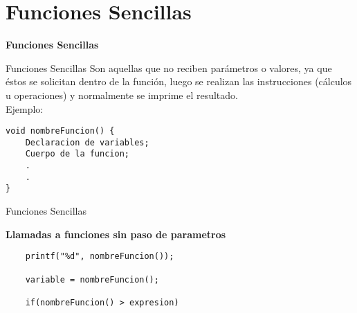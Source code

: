 \section*{Funciones Sencillas}

\begin{frame}[c] 
\centering
\huge \textbf{Funciones Sencillas}
\end{frame}



\begin{frame}[fragile]{Funciones Sencillas}
\hspace{5mm}Son aquellas que no reciben parámetros o valores, ya que éstos se solicitan dentro de la función, luego se realizan las instrucciones (cálculos u operaciones) y normalmente se imprime el resultado.\\Ejemplo:
\begin{lstlisting}
void nombreFuncion() {
    Declaracion de variables;
    Cuerpo de la funcion;
    .
    .
}
\end{lstlisting}
\end{frame}



\begin{frame}[fragile]{Funciones Sencillas}
\begin{center}
    \textbf{Llamadas a funciones sin paso de parametros}
\end{center}
\begin{lstlisting}
    printf("%d", nombreFuncion());
    
    variable = nombreFuncion();
    
    if(nombreFuncion() > expresion)
\end{lstlisting}
\end{frame}